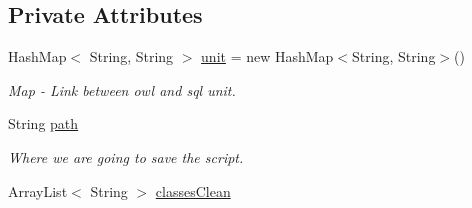 \subsection*{Private Attributes}
\begin{DoxyCompactItemize}
\item 
HashMap$<$ String, String $>$ \hyperlink{class_data_base_1_1_tables_a5f222e493ed4508b40f5fd8e50becaae}{unit} = new HashMap$<$String, String$>$()
\begin{DoxyCompactList}\small\item\em Map -\/ Link between owl and sql unit. \end{DoxyCompactList}\item 
\hypertarget{class_data_base_1_1_tables_ae80958e71da9b7fc4bf4e138f377b59f}{
String \hyperlink{class_data_base_1_1_tables_ae80958e71da9b7fc4bf4e138f377b59f}{path}}
\label{class_data_base_1_1_tables_ae80958e71da9b7fc4bf4e138f377b59f}

\begin{DoxyCompactList}\small\item\em Where we are going to save the script. \end{DoxyCompactList}\item 
\hypertarget{class_data_base_1_1_tables_a780c97151dcb24984456109f95ebc22d}{
ArrayList$<$ String $>$ \hyperlink{class_data_base_1_1_tables_a780c97151dcb24984456109f95ebc22d}{classesClean}}
\label{class_data_base_1_1_tables_a780c97151dcb24984456109f95ebc22d}


\end{DoxyCompactItemize}
